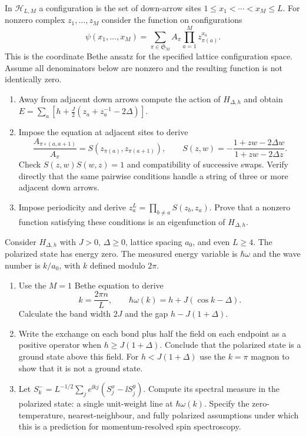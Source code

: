 \begin{exercise}
In $\mathcal H_{L,M}$ a configuration is the set of down-arrow sites
$1\le x_1<\cdots<x_M\le L$. For nonzero complex $z_1,\dots,z_M$
consider the function on configurations
\[
 \psi(x_1,\dots,x_M)=
 \sum_{\pi\in\mathfrak S_M}A_\pi
       \prod_{a=1}^M z_{\pi(a)}^{x_a}.
\]
This is the coordinate Bethe ansatz for the specified lattice
configuration space. Assume all denominators below are nonzero and
the resulting function is not identically zero.
\begin{enumerate}[label=(\alph*)]
\item Away from adjacent down arrows compute the action of
$H_{\Delta,h}$ and obtain
$E=\sum_a[h+\frac J2(z_a+z_a^{-1}-2\Delta)]$.
\item Impose the equation at adjacent sites to derive
\[
 \frac{A_{\pi\circ(a,a+1)}}{A_\pi}
 =S(z_{\pi(a)},z_{\pi(a+1)}),\qquad
 S(z,w)=-\frac{1+zw-2\Delta w}{1+zw-2\Delta z}.
\]
Check $S(z,w)S(w,z)=1$ and compatibility of successive swaps.
Verify directly that the same pairwise conditions handle a string
of three or more adjacent down arrows.
\item Impose periodicity and derive
$z_a^L=\prod_{b\ne a}S(z_b,z_a)$. Prove that a nonzero function
satisfying these conditions is an eigenfunction of $H_{\Delta,h}$.
\end{enumerate}
\end{exercise}

\begin{exercise}
Consider $H_{\Delta,h}$ with $J>0$, $\Delta\ge0$, lattice spacing
$a_0$, and even $L\ge4$. The polarized state has energy zero.
The measured energy variable is $\hbar\omega$ and the wave number is
$k/a_0$, with $k$ defined modulo $2\pi$.
\begin{enumerate}[label=(\alph*)]
\item Use the $M=1$ Bethe equation to derive
\[
 k=\frac{2\pi n}{L},\qquad
 \hbar\omega(k)=h+J(\cos k-\Delta).
\]
Calculate the band width $2J$ and the gap $h-J(1+\Delta)$.
\item Write the exchange on each bond plus half the field on each
endpoint as a positive operator when $h\ge J(1+\Delta)$.
Conclude that the polarized state is a ground state above this
field. For $h<J(1+\Delta)$ use the $k=\pi$ magnon to show that
it is not a ground state.
\item Let $S^-_k=L^{-1/2}\sum_j e^{\ii kj}(S^x_j-\ii S^y_j)$.
Compute its spectral measure in the polarized state: a single
unit-weight line at $\hbar\omega(k)$. Specify the zero-temperature,
nearest-neighbour, and fully polarized assumptions under which
this is a prediction for momentum-resolved spin spectroscopy.
\end{enumerate}
\end{exercise}
